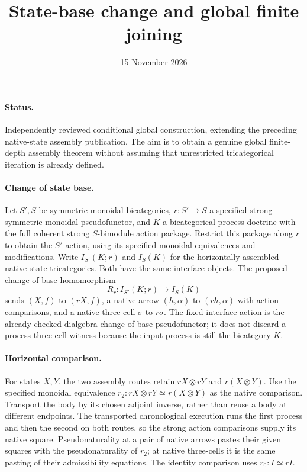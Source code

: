 \documentclass{article}
\title{State-base change and global finite joining}
\date{15 November 2026}
\begin{document}
\maketitle
\paragraph{Status.} Independently reviewed conditional global construction, extending the preceding native-state assembly publication. The aim is to obtain a genuine global finite-depth assembly theorem without assuming that unrestricted tricategorical iteration is already defined.

\paragraph{Change of state base.} Let $S',S$ be symmetric monoidal bicategories, $r:S'\to S$ a specified strong symmetric monoidal pseudofunctor, and $K$ a bicategorical process doctrine with the full coherent strong $S$-bimodule action package. Restrict this package along $r$ to obtain the $S'$ action, using its specified monoidal equivalences and modifications. Write $I_{S'}(K;r)$ and $I_S(K)$ for the horizontally assembled native state tricategories. Both have the same interface objects. The proposed change-of-base homomorphism
\[
 R_r:I_{S'}(K;r)\longrightarrow I_S(K)
\]
sends $(X,f)$ to $(rX,f)$, a native arrow $(h,\alpha)$ to $(rh,\alpha)$ with action comparisons, and a native three-cell $\sigma$ to $r\sigma$. The fixed-interface action is the already checked dialgebra change-of-base pseudofunctor; it does not discard a process-three-cell witness because the input process is still the bicategory $K$.

\paragraph{Horizontal comparison.} For states $X,Y$, the two assembly routes retain $rX\otimes rY$ and $r(X\otimes Y)$. Use the specified monoidal equivalence $r_2:rX\otimes rY\simeq r(X\otimes Y)$ as the native comparison. Transport the body by its chosen adjoint inverse, rather than reuse a body at different endpoints. The transported chronological execution runs the first process and then the second on both routes, so the strong action comparisons supply its native square. Pseudonaturality at a pair of native arrows pastes their given squares with the pseudonaturality of $r_2$; at native three-cells it is the same pasting of their admissibility equations. The identity comparison uses $r_0:I\simeq rI$.
\end{document}
